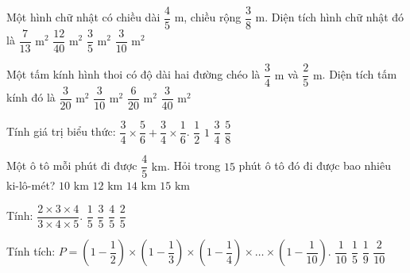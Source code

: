 \begin{ex} %
Một hình chữ nhật có chiều dài $\dfrac{4}{5}\text{ m}$, chiều rộng $\dfrac{3}{8}\text{ m}$. Diện tích hình chữ nhật đó là
\choice
{$\dfrac{7}{13}\text{ m}^2$}
{$\dfrac{12}{40}\text{ m}^2$}
{$\dfrac{3}{5}\text{ m}^2$}
{\True $\dfrac{3}{10}\text{ m}^2$}
\end{ex}

\begin{ex} %
Một tấm kính hình thoi có độ dài hai đường chéo là $\dfrac{3}{4}\text{ m}$ và $\dfrac{2}{5}\text{ m}$. Diện tích tấm kính đó là
\choice
{\True $\dfrac{3}{20}\text{ m}^2$}
{$\dfrac{3}{10}\text{ m}^2$}
{$\dfrac{6}{20}\text{ m}^2$}
{$\dfrac{3}{40}\text{ m}^2$}
\end{ex}

\begin{ex} %
Tính giá trị biểu thức: $\dfrac{3}{4} \times \dfrac{5}{6} + \dfrac{3}{4} \times \dfrac{1}{6}$.
\choice
{$\dfrac{1}{2}$}
{$1$}
{\True $\dfrac{3}{4}$}
{$\dfrac{5}{8}$}
\end{ex}

\begin{ex} %
Một ô tô mỗi phút đi được $\dfrac{4}{5}\text{ km}$. Hỏi trong $15$ phút ô tô đó đi được bao nhiêu ki-lô-mét?
\choice
{$10\text{ km}$}
{\True $12\text{ km}$}
{$14\text{ km}$}
{$15\text{ km}$}
\end{ex}

\begin{ex} %
Tính: $\dfrac{2 \times 3 \times 4}{3 \times 4 \times 5}$.
\choice
{$\dfrac{1}{5}$}
{$\dfrac{3}{5}$}
{$\dfrac{4}{5}$}
{\True $\dfrac{2}{5}$}
\end{ex}

\begin{ex} %
Tính tích: $P = \left(1 - \dfrac{1}{2}\right) \times \left(1 - \dfrac{1}{3}\right) \times \left(1 - \dfrac{1}{4}\right) \times \dots \times \left(1 - \dfrac{1}{10}\right)$.
\choice
{\True $\dfrac{1}{10}$}
{$\dfrac{1}{5}$}
{$\dfrac{1}{9}$}
{$\dfrac{2}{10}$}
\end{ex}

